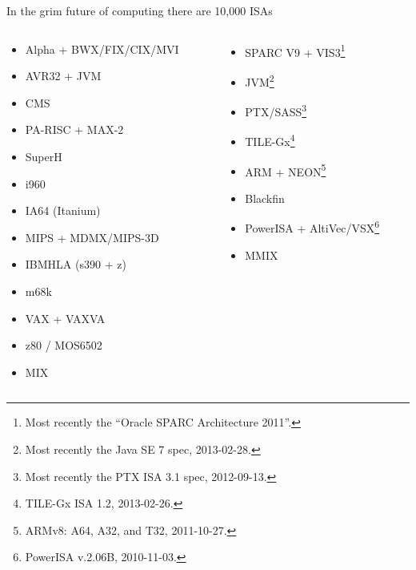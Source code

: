 \documentclass[mathserif,xcolor={dvipsnames,table}]{beamer}
\begin{document}
\begin{frame}{In the grim future of computing there are 10,000 ISAs}
\begin{columns}
\begin{column}{.5\textwidth}
\footnotesize{
\begin{itemize}
\item Alpha + BWX/FIX/CIX/MVI
\item AVR32 + JVM
\item CMS
\item PA-RISC + MAX-2
\item SuperH 
\item i960
\item IA64 (Itanium)
\item MIPS + MDMX/MIPS-3D
\item IBMHLA (s390 + z)
\item m68k
\item VAX + VAXVA
\item z80 / MOS6502
\item MIX
\end{itemize}
}
\end{column}
\begin{column}{.5\textwidth}
\footnotesize{
\begin{itemize}
\item SPARC V9 + VIS3\footnote{\tiny{Most recently the ``Oracle SPARC Architecture 2011''.}}
\item JVM\footnote{\tiny{Most recently the Java SE 7 spec, 2013-02-28.}}
\item PTX/SASS\footnote{\tiny{Most recently the PTX ISA 3.1 spec, 2012-09-13.}}
\item TILE-Gx\footnote{\tiny{TILE-Gx ISA 1.2, 2013-02-26.}}
\item ARM + NEON\footnote{\tiny{ARMv8: A64, A32, and T32, 2011-10-27.}}
\item Blackfin
\item PowerISA + AltiVec/VSX\footnote{\tiny{PowerISA v.2.06B, 2010-11-03.}}
\item MMIX
\end{itemize}
}
\end{column}
\end{columns}
\end{frame}
\end{document}

